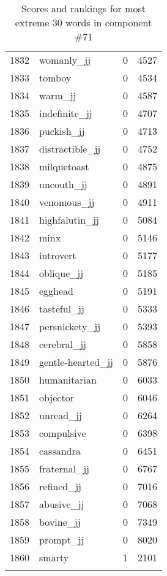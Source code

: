 \begin{longtable}[!htbp]{| rlr@{.}l |}
    1832 & womanly\_jj & 0 & 4527 \\
    1833 & tomboy & 0 & 4534 \\
    1834 & warm\_jj & 0 & 4587 \\
    1835 & indefinite\_jj & 0 & 4707 \\
    1836 & puckish\_jj & 0 & 4713 \\
    1837 & distractible\_jj & 0 & 4752 \\
    1838 & milquetoast & 0 & 4875 \\
    1839 & uncouth\_jj & 0 & 4891 \\
    1840 & venomous\_jj & 0 & 4911 \\
    1841 & highfalutin\_jj & 0 & 5084 \\
    1842 & minx & 0 & 5146 \\
    1843 & introvert & 0 & 5177 \\
    1844 & oblique\_jj & 0 & 5185 \\
    1845 & egghead & 0 & 5191 \\
    1846 & tasteful\_jj & 0 & 5333 \\
    1847 & persnickety\_jj & 0 & 5393 \\
    1848 & cerebral\_jj & 0 & 5858 \\
    1849 & gentle-hearted\_jj & 0 & 5876 \\
    1850 & humanitarian & 0 & 6033 \\
    1851 & objector & 0 & 6046 \\
    1852 & unread\_jj & 0 & 6264 \\
    1853 & compulsive & 0 & 6398 \\
    1854 & cassandra & 0 & 6451 \\
    1855 & fraternal\_jj & 0 & 6767 \\
    1856 & refined\_jj & 0 & 7016 \\
    1857 & abusive\_jj & 0 & 7068 \\
    1858 & bovine\_jj & 0 & 7349 \\
    1859 & prompt\_jj & 0 & 8020 \\
    1860 & smarty & 1 & 2101 \\
    \hline
    \caption{Scores and rankings for most extreme 30 words in component \#71} \\
\end{longtable}
